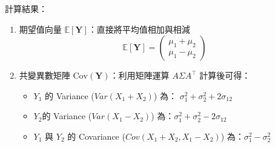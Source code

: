 \documentclass{article}
\begin{document}
\noindent
計算結果：
\begin{enumerate}
    \item 期望值向量 $\mathbb{E}[\bm Y]$：直接將平均值相加與相減
    $$\mathbb{E}[\bm Y] = \begin{pmatrix} \mu_1 + \mu_2 \\ \mu_1 - \mu_2 \end{pmatrix}$$
    \item 共變異數矩陣 $\mathrm{Cov}(\bm Y)$：利用矩陣運算 $A\Sigma A^\top$ 
    計算後可得：
    \begin{itemize}
        \item $Y_1$ 的 Variance ($Var(X_1+X_2)$) 為：
        $\sigma_1^2 + \sigma_2^2 + 2\sigma_{12}$
        \item $Y_2$的 Variance ($Var(X_1-X_2)$) 為：$\sigma_1^2 + \sigma_2^2 - 2\sigma_{12}$
        \item $Y_1$ 與 $Y_2$ 的 Covariance ($Cov(X_1+X_2, X_1-X_2)$) 為：$\sigma_1^2 - \sigma_2^2$
    \end{itemize}
\end{enumerate}
\begin{center}
\end{center}
\end{document}
